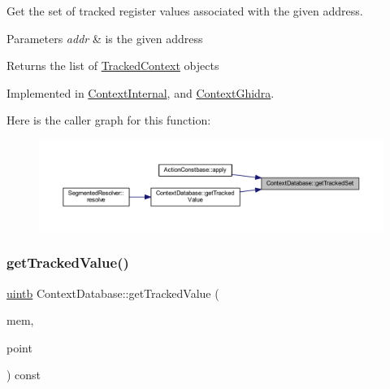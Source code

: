 Get the set of tracked register values associated with the given address. 


\begin{DoxyParams}{Parameters}
{\em addr} & is the given address \\
\hline
\end{DoxyParams}
\begin{DoxyReturn}{Returns}
the list of \mbox{\hyperlink{struct_tracked_context}{Tracked\+Context}} objects 
\end{DoxyReturn}


Implemented in \mbox{\hyperlink{class_context_internal_a0953f0bba2a187d4cd001463c9f667ab}{Context\+Internal}}, and \mbox{\hyperlink{class_context_ghidra_a4f6d11b1a9dd101791a11ee522139828}{Context\+Ghidra}}.

Here is the caller graph for this function\+:
\nopagebreak
\begin{figure}[H]
\begin{center}
\leavevmode
\includegraphics[width=350pt]{class_context_database_a6ea1e4b793286c0b1ecbafcc58422339_icgraph}
\end{center}
\end{figure}
\mbox{\label{class_context_database_a4e4ffd9c15465a2503ddc38a54caab61}} 
\subsubsection{\texorpdfstring{getTrackedValue()}{getTrackedValue()}}
{\footnotesize\ttfamily \mbox{\hyperlink{types_8h_a2db313c5d32a12b01d26ac9b3bca178f}{uintb}} Context\+Database\+::get\+Tracked\+Value (\begin{DoxyParamCaption}\item[{const \mbox{\hyperlink{struct_varnode_data}{Varnode\+Data}} \&}]{mem,  }\item[{const \mbox{\hyperlink{class_address}{Address}} \&}]{point }\end{DoxyParamCaption}) const}



